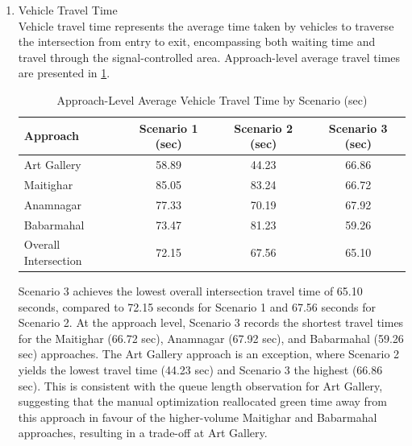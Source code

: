 \begin{enumerate}[label=\alph*.]
   Scenario 3 records the shortest queue lengths at the Maitighar (20.08 m), Anamnagar (5.15 m), and Babarmahal (34.36 m) approaches, as well as the lowest overall average queue length of 24.95 m. This represents a reduction of approximately 28\% compared to Scenario 1 (34.87 m) and 35\% compared to Scenario 2 (38.38 m) at the intersection level. The exception is the Art Gallery approach, where Scenario 3 records a marginally higher queue length (26.24 m) compared to Scenario 1 (20.63 m), which may be attributed to the slightly increased green time allocated to competing phases under the manual optimization. Scenario 2 consistently produces longer queues than Scenario 1 across three out of four approaches, further reinforcing that the VISSIM built-in optimization does not yield an overall improvement over existing conditions for this intersection.
   
   \item Vehicle Travel Time \\
   Vehicle travel time represents the average time taken by vehicles to traverse the intersection from entry to exit, encompassing both waiting time and travel through the signal-controlled area. Approach-level average travel times are presented in \cref{tab:vtt}.
   \begin{table}[h!]
   \centering
   \caption{Approach-Level Average Vehicle Travel Time by Scenario (sec)}
   \begin{tabular}{|l|c|c|c|}
   \hline
   Approach & Scenario 1 (sec) & Scenario 2 (sec) & Scenario 3 (sec) \\
   \hline
   Art Gallery & 58.89 & 44.23 & 66.86 \\
   Maitighar & 85.05 & 83.24 & 66.72 \\
   Anamnagar & 77.33 & 70.19 & 67.92 \\
   Babarmahal & 73.47 & 81.23 & 59.26 \\
   \hline
   Overall Intersection & 72.15 & 67.56 & 65.10 \\
   \hline
   \end{tabular}
   \label{tab:vtt}
   \end{table}

   Scenario 3 achieves the lowest overall intersection travel time of 65.10 seconds, compared to 72.15 seconds for Scenario 1 and 67.56 seconds for Scenario 2. At the approach level, Scenario 3 records the shortest travel times for the Maitighar (66.72 sec), Anamnagar (67.92 sec), and Babarmahal (59.26 sec) approaches. The Art Gallery approach is an exception, where Scenario 2 yields the lowest travel time (44.23 sec) and Scenario 3 the highest (66.86 sec). This is consistent with the queue length observation for Art Gallery, suggesting that the manual optimization reallocated green time away from this approach in favour of the higher-volume Maitighar and Babarmahal approaches, resulting in a trade-off at Art Gallery.
\end{enumerate}

